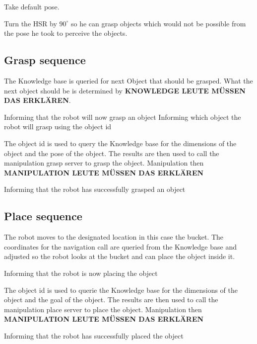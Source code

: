 \documentclass[main.tex]{subfiles}
\begin{document}
	Take default pose.
	
		
	Turn the HSR by $90^\circ$ so he can grasp objects which would not be possible from the pose he took to perceive the objects.
	
	\subsection{Grasp sequence}
	
    The Knowledge base is queried for next Object that should be grasped.
	What the next object should be is determined by \textbf{KNOWLEDGE LEUTE MÜSSEN DAS ERKLÄREN}.	
	
	Informing that the robot will now grasp an object
	Informing which object the robot will grasp using the object id
	
	The object id is used to query the Knowledge base for the dimensions of the object and the pose of the object. The results are then used to call the manipulation grasp server to grasp the object. Manipulation then \textbf{MANIPULATION LEUTE MÜSSEN DAS ERKLÄREN}
	 
	Informing that the robot has successfully grasped an object
    
	\subsection{Place sequence}
	The robot moves to the designated location in this case the bucket.
	The coordinates for the navigation call are queried from the Knowledge base and adjusted so the robot looks at the bucket and can place the object inside it. 
	
	Informing that the robot is now placing the object

	The object id is used to querie the Knowledge base for the dimensions of the object and the goal of the object. The results are then used to call the manipulation place server to place the object. Manipulation then \textbf{MANIPULATION LEUTE MÜSSEN DAS ERKLÄREN}
	 
	Informing that the robot has successfully placed the object
\end{document}
